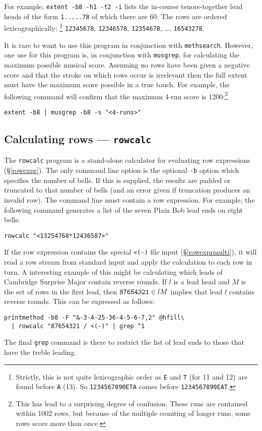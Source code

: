 \documentclass[a4paper,11pt,oneside]{book}
\makeatletter
\newcommand{\ttcmdidx}[1]{\texttt{#1}\index{#1@{\texttt{#1}}}}
\def\methsearch{\texttt{meth\-search}}
\newcommand{\sref}[1]{\hyperref[#1]{\S\ref{#1}}}
\makeatother
\begin{document}
For example, \verb+extent -b8 -h1 -t2 -i+ lists the 
in-course tenors-together lead heads
of the form \verb+1.....78+ of which there are 60.  
The rows are ordered lexicographically:%
\footnote{Strictly, this is not quite lexicographic 
order as \verb+E+ and \verb+T+ (for 11 and 12) are found before \verb+A+ (13).
So \verb+1234567890ETA+ comes before \verb+1234567890EAT+.}
\verb+12345678+, \verb+12346578+, \verb+12354678+, \ldots, \verb+16543278+.

It is rare to want to use this program in conjunction with \methsearch.
However, one use for this program is, in conjunction with \texttt{musgrep}, for
calculating the maximum possible musical score.  Assuming no rows 
have been given a negative score and that the stroke on which rows occur
is irrelevant then the full extent must have the maximum score possible
in a true touch.
For example, the following command will confirm that the maximum 4-run score
is 1200:\footnote{This has lead to a surprising degree of confusion.  These
runs are contained within 1002 rows, but because of the multiple counting of
longer runs, some rows score more than once.}
\begin{Verbatim}
extent -b8 | musgrep -b8 -s "<4-runs>" 
\end{Verbatim}


\subsection{Calculating rows — \texttt{rowcalc}}\label{rowcalc}

The \ttcmdidx{rowcalc} program is a stand-alone calculator for evaluating
row expressions (\sref{rowexpr}).  The only command line option is the 
optional \verb+-b+ option which specifies the number of bells. 
If this is supplied, the results are padded or truncated to that number of 
bells (and an error given if truncation produces an invalid row).
The command line must contain a row expression.  
For example, the following command generates a list
of the seven Plain Bob lead ends on eight bells:
\begin{Verbatim}
rowcalc "<13254768*12436587>"
\end{Verbatim}

If the row expression contains the special \verb+<(-)+ file input 
(\sref{rowexprmulti}), it will read a row stream from standard input
and apply the calculation to each row in turn.  A interesting example of 
this might be calculating which leads of Cambridge Surprise Major contain
reverse rounds.  If $l$ is a lead head and $M$ is the set of rows in the 
first lead, then $\hbox{\texttt{87654321}} \in lM$ implies that lead $l$
contains reverse rounds.  This can be expressed as follows:
\begin{Verbatim}[commandchars=@~~]
printmethod -b8 -F "&-3-4-25-36-4-5-6-7,2" @hfill\
  | rowcalc "87654321 / <(-)" | grep ^1 
\end{Verbatim}
The final \texttt{grep} command is there to restrict the list of lead ends
to those that have the treble leading.
\end{document}
